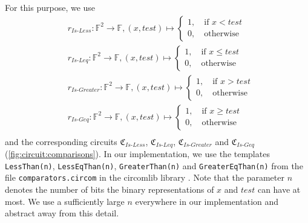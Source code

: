 For this purpose, we use \begin{align*}
    & r_{Is\text{-}Less}:\mathbb{F}^2\to\mathbb{F}, (x,test)\mapsto\begin{cases}
        1,\quad\text{if } x < test\\
        0,\quad\text{otherwise}
    \end{cases}\\
    & r_{Is\text{-}Leq}:\mathbb{F}^2\to\mathbb{F}, (x,test)\mapsto\begin{cases}
        1,\quad\text{if } x \leq test\\
        0,\quad\text{otherwise}
    \end{cases}\\
    & r_{Is\text{-}Greater}:\mathbb{F}^2\to\mathbb{F}, (x,test)\mapsto\begin{cases}
        1,\quad\text{if } x > test\\
        0,\quad\text{otherwise}
    \end{cases}\\
    & r_{Is\text{-}Geq}:\mathbb{F}^2\to\mathbb{F}, (x,test)\mapsto\begin{cases}
        1,\quad\text{if } x \geq test\\
        0,\quad\text{otherwise}
    \end{cases}\\
\end{align*}
and the corresponding circuits $\mathfrak{C}_{Is\text{-}Less}$, $\mathfrak{C}_{Is\text{-}Leq}$, $\mathfrak{C}_{Is\text{-}Greater}$ and $\mathfrak{C}_{Is\text{-}Geq}$ (\cref{fig:circuit:comparisons}).
In our implementation, we use the templates \verb|LessThan(n)|, \verb|LessEqThan(n)|, \verb|GreaterThan(n)| and \verb|GreaterEqThan(n)| from the file \verb|comparators.circom| in the circomlib library \cite{jordy_baylina_iden3circomlib_2025}.
Note that the parameter $n$ denotes the number of bits the binary representations of $x$ and $test$ can have at most. 
We use a sufficiently large $n$ everywhere in our implementation and abstract away from this detail.

